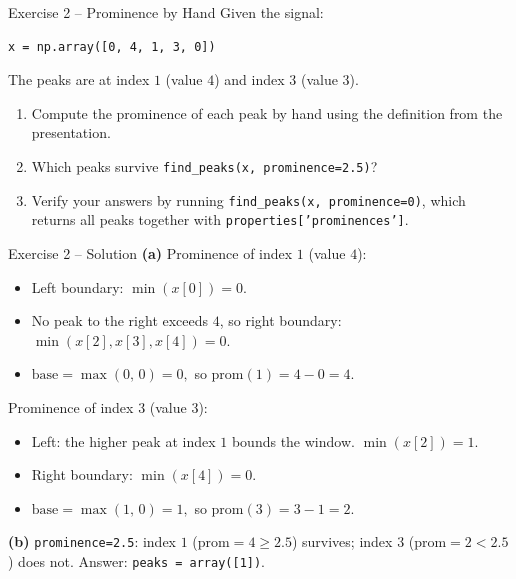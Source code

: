 \documentclass{beamer}
\begin{document}
\begin{frame}[fragile]{Exercise 2 -- Prominence by Hand}
  Given the signal:
  \begin{lstlisting}
x = np.array([0, 4, 1, 3, 0])
  \end{lstlisting}
  The peaks are at index \(1\) (value \(4\)) and index \(3\) (value \(3\)).
  \begin{enumerate}
    \item[(a)] Compute the prominence of each peak by hand using the definition from the presentation.
    \item[(b)] Which peaks survive \texttt{find\_peaks(x, prominence=2.5)}?
    \item[(c)] Verify your answers by running \texttt{find\_peaks(x, prominence=0)}, which returns all peaks together with \texttt{properties['prominences']}.
  \end{enumerate}
\end{frame}

\begin{frame}{Exercise 2 -- Solution}
  \textbf{(a)} Prominence of index \(1\) (value \(4\)):
  \begin{itemize}
    \item Left boundary: \(\min(x[0]) = 0.\)
    \item No peak to the right exceeds \(4\), so right boundary: \(\min(x[2], x[3], x[4]) = 0.\)
    \item \(\text{base} = \max(0,\, 0) = 0,\) so \(\text{prom}(1) = 4 - 0 = 4.\)
  \end{itemize}
  Prominence of index \(3\) (value \(3\)):
  \begin{itemize}
    \item Left: the higher peak at index \(1\) bounds the window. \(\min(x[2]) = 1.\)
    \item Right boundary: \(\min(x[4]) = 0.\)
    \item \(\text{base} = \max(1,\, 0) = 1,\) so \(\text{prom}(3) = 3 - 1 = 2.\)
  \end{itemize}
  \textbf{(b)} \texttt{prominence=2.5}: index \(1\) (\(\text{prom} = 4 \geq 2.5\)) survives; index \(3\) (\(\text{prom} = 2 < 2.5\)) does not.
  Answer: \texttt{peaks = array([1])}.
\end{frame}
\end{document}
